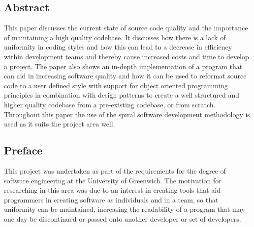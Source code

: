 \subsection*{Abstract}
This paper discusses the current state of source code quality and the importance of maintaining a high quality codebase. It discusses how there is a lack of uniformity in coding styles and how this can lead to a decrease in efficiency within development teams and thereby cause increased costs and time to develop a project. The paper also shows an in-depth implementation of a program that can aid in increasing software quality and how it can be used to reformat source code to a user defined style with support for object oriented programming principles in combination with design patterns to create a well structured and higher quality codebase from a pre-existing codebase, or from scratch. Throughout this paper the use of the spiral software development methodology is used as it suits the project area well.

\subsection*{Preface}
This project was undertaken as part of the requirements for the degree of software engineering at the University of Greenwich. The motivation for researching in this area was due to an interest in creating tools that aid programmers in creating software as individuals and in a team, so that uniformity can be maintained, increasing the readability of a program that may one day be discontinued or passed onto another developer or set of developers.
